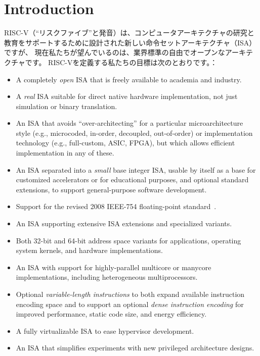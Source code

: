 \chapter{Introduction}

\begin{comment}
RISC-V (pronounced ``risk-five'') is a new instruction-set
architecture (ISA) that was originally designed to support computer
architecture research and education, but which we now hope will also
become a standard free and open architecture for industry
implementations.  Our goals in defining RISC-V include:
\end{comment}
RISC-V（``リスクファイブ''と発音）は、コンピュータアーキテクチャの研究と
教育をサポートするために設計された新しい命令セットアーキテクチャ（ISA）ですが、
現在私たちが望んでいるのは、業界標準の自由でオープンなアーキテクチャです。
RISC-Vを定義する私たちの目標は次のとおりです。：
\vspace{-0.1in}
\begin{itemize}
\parskip 0pt
\itemsep 1pt
\item A completely {\em open} ISA that is freely available to
  academia and industry.
\item A {\em real} ISA suitable for direct native hardware implementation,
  not just simulation or binary translation.
\item An ISA that avoids ``over-architecting'' for a particular
  microarchitecture style (e.g., microcoded, in-order, decoupled,
  out-of-order) or implementation technology (e.g., full-custom, ASIC,
  FPGA), but which allows efficient implementation in any of these.
\item An ISA separated into a {\em small} base integer ISA, usable by
  itself as a base for customized accelerators or for educational
  purposes, and optional standard extensions, to support
  general-purpose software development.
\item Support for the revised 2008 IEEE-754 floating-point standard~\cite{ieee754-2008}.
\item An ISA supporting extensive ISA extensions and
  specialized variants.
\item Both 32-bit and 64-bit address space variants for
  applications, operating system kernels, and hardware implementations.
\item An ISA with support for highly-parallel multicore
  or manycore implementations, including heterogeneous multiprocessors.
\item Optional {\em variable-length instructions} to both expand available
  instruction encoding space and to support an optional {\em dense
  instruction encoding} for improved performance, static code size,
  and energy efficiency.
\item A fully virtualizable ISA to ease hypervisor development.
\item An ISA that simplifies experiments with new privileged architecture designs.
\end{itemize}
\vspace{-0.1in}

